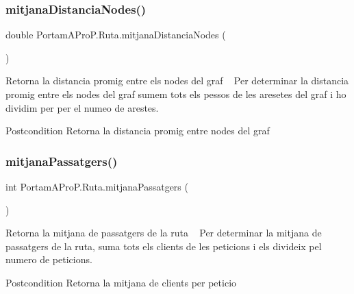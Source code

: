 \subsubsection{\texorpdfstring{mitjana\+Distancia\+Nodes()}{mitjanaDistanciaNodes()}}
{\footnotesize\ttfamily double Portam\+A\+Pro\+P.\+Ruta.\+mitjana\+Distancia\+Nodes (\begin{DoxyParamCaption}{ }\end{DoxyParamCaption})}



Retorna la distancia promig entre els nodes del graf ~\newline
 Per determinar la distancia promig entre els nodes del graf sumem tots els pessos de les aresetes del graf i ho dividim per per el numeo de arestes. 

\begin{DoxyPostcond}{Postcondition}
Retorna la distancia promig entre nodes del graf 
\end{DoxyPostcond}
\mbox{\label{class_portam_a_pro_p_1_1_ruta_adbf94c3c5a00e9737f821c3794034e3a}} 
\subsubsection{\texorpdfstring{mitjana\+Passatgers()}{mitjanaPassatgers()}}
{\footnotesize\ttfamily int Portam\+A\+Pro\+P.\+Ruta.\+mitjana\+Passatgers (\begin{DoxyParamCaption}{ }\end{DoxyParamCaption})}



Retorna la mitjana de passatgers de la ruta ~\newline
 Per determinar la mitjana de passatgers de la ruta, suma tots els clients de les peticions i els divideix pel numero de peticions. 

\begin{DoxyPostcond}{Postcondition}
Retorna la mitjana de clients per peticio 
\end{DoxyPostcond}
\mbox{\label{class_portam_a_pro_p_1_1_ruta_a59ca173f24b9b180ae97cb5c1d7b25e3}} 
